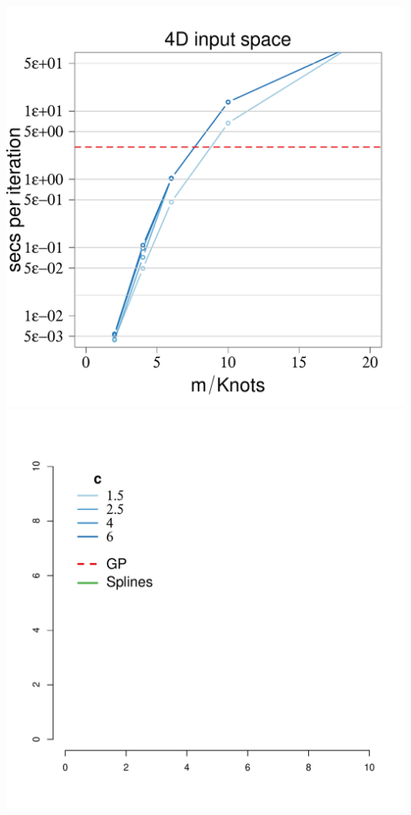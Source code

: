 \documentclass[8pt]{beamer} %
\begin{document}
\begin{frame}[t]
\begin{center}
\includegraphics[scale=0.20, trim = 30.2mm 0mm 10mm 0mm, clip]{ch5_fig20_time4D_diabetes_2.pdf}
\hspace{-1mm} \includegraphics[scale=0.28, trim = 28mm 60mm 112mm 10mm, clip]{ch5_fig20_legend_diabetes_2.pdf}
\end{center}


\end{frame}
\end{document}
